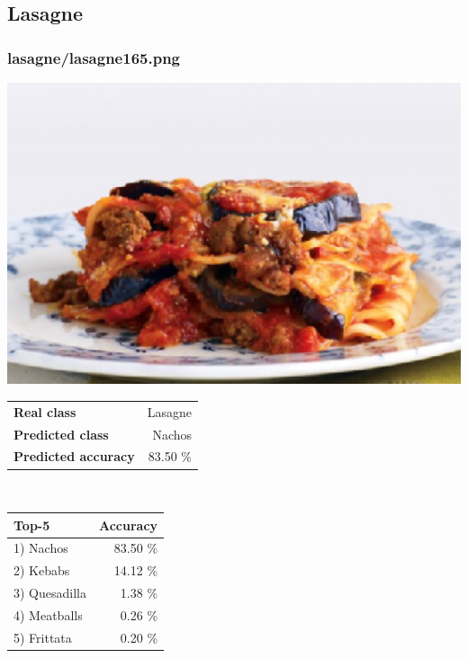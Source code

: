 \subsection{Lasagne}
    
\subsubsection{lasagne/lasagne165.png}

\begin{minipage}[t]{0.4\textwidth}
	\vspace{0pt}
	\includegraphics[width=\linewidth]{images/evaluation-images/lasagne/lasagne165.png}
\end{minipage}
\hfill
\begin{minipage}[t]{0.5\textwidth}
	\vspace{0pt}\raggedright
	\begin{tabularx}{\textwidth}{X r}
		\small \textbf{Real class} & \small Lasagne\\
		\small \textbf{Predicted class} & \small Nachos\\
		\small \textbf{Predicted accuracy} & \small 83.50 \%
    \end{tabularx}\\
    
    \vspace{6pt}
	\begin{tabularx}{\textwidth}{X r}
        \small \textbf{Top-5} & \small \textbf{Accuracy} \\
        \hline
		\small 1) Nachos & \small 83.50 \%\\\small 2) Kebabs & \small 14.12 \%\\\small 3) Quesadilla & \small 1.38 \%\\\small 4) Meatballs & \small 0.26 \%\\\small 5) Frittata & \small 0.20 \%
    \end{tabularx}
\end{minipage}
    
